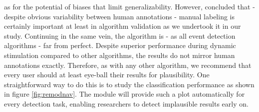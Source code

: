 as for the potential of biases that limit generalizability. However, \cite{Hooge2018} concluded that - despite
obvious variability between human annotations - manual labeling is certainly important at least in algorithm
validation as we undertook it in our study. Continuing in the same vein, the \remodnav algorithm is - as all event
detection algorithms - far from perfect. Despite superior performance during dynamic stimulation compared to other
algorithms, the results do not mirror human annotations exactly. Therefore, as with any other algorithm, we recommend
that every user should at least eye-ball their results for plausibility. One straightforward way to do this is to
study the classification performance as shown in figure \ref{fig:remodnav}. The \remodnav module will provide such a
plot automatically for every detection task, enabling researchers to detect implausible results early on.\\





